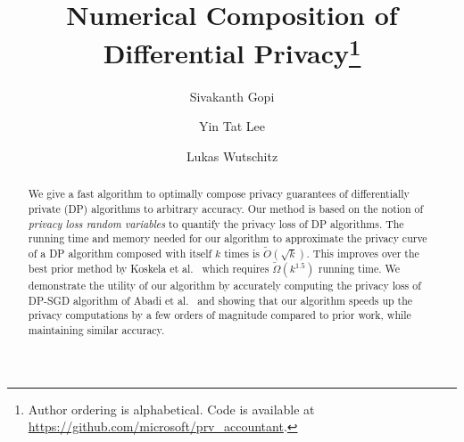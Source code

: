 \documentclass{article}
\title{Numerical Composition of Differential Privacy\footnote{Author ordering is alphabetical. Code is available at \url{https://github.com/microsoft/prv_accountant}.}}
\author[1]{Sivakanth Gopi}
\author[2]{Yin Tat Lee}
\author[1]{Lukas Wutschitz}
\affil[1]{Microsoft\\
\texttt{\{sigopi,lukas.wutschitz\}@microsoft.com}}
\affil[2]{University of Washington\\
\texttt{yintat@uw.edu}}
\date{}
\begin{document}
\maketitle

\begin{abstract}
We give a fast algorithm to optimally compose privacy guarantees of differentially private (DP) algorithms to arbitrary accuracy. Our method is based on the notion of \emph{privacy loss random variables} to quantify the privacy loss of DP algorithms. %
The running time and memory needed for our algorithm to approximate the privacy curve of a DP algorithm composed with itself $k$ times is $\tilde{O}(\sqrt{k})$. This improves over the best prior method by Koskela et al.~\cite{koskela2021computing} which requires $\tilde{\Omega}(k^{1.5})$ running time. We demonstrate the utility of our algorithm by accurately computing the privacy loss of DP-SGD algorithm of Abadi et al.~\cite{Abadi16} and showing that our algorithm speeds up the privacy computations by a few orders of magnitude compared to prior work, while maintaining similar accuracy.
\end{abstract}

\newpage
\tableofcontents
\newpage
\end{document}
